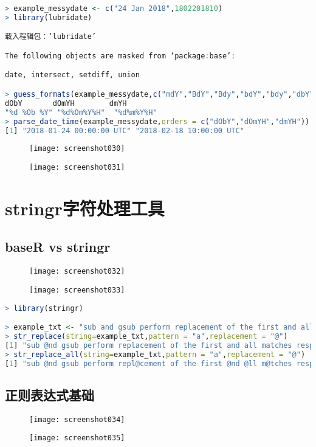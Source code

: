 \documentclass[11pt,a4paper,oneside]{book}
\begin{document}
\begin{lstlisting}[language=r]
> example_messydate <- c("24 Jan 2018",1802201810)
> library(lubridate)

载入程辑包：‘lubridate’

The following objects are masked from ‘package:base’:

date, intersect, setdiff, union

> guess_formats(example_messydate,c("mdY","BdY","Bdy","bdY","bdy","dbY","dmYH"))
dObY       dOmYH        dmYH 
"%d %Ob %Y" "%d%Om%Y%H"  "%d%m%Y%H" 
> parse_date_time(example_messydate,orders = c("dObY","dOmYH","dmYH"))
[1] "2018-01-24 00:00:00 UTC" "2018-02-18 10:00:00 UTC"
\end{lstlisting}
\begin{figure}[H]
	\centering
	\texttt{[image: screenshot030]}
\end{figure}
\begin{figure}[H]
	\centering
	\texttt{[image: screenshot031]}
\end{figure}

\section{stringr字符处理工具}
\subsection{baseR vs stringr}
\begin{figure}[H]
	\centering
	\texttt{[image: screenshot032]}
\end{figure}
\begin{figure}[H]
	\centering
	\texttt{[image: screenshot033]}
\end{figure}

\begin{lstlisting}[language=r]
> library(stringr)

> example_txt <- "sub and gsub perform replacement of the first and all matches respectively."
> str_replace(string=example_txt,pattern = "a",replacement = "@")
[1] "sub @nd gsub perform replacement of the first and all matches respectively."
> str_replace_all(string=example_txt,pattern = "a",replacement = "@")
[1] "sub @nd gsub perform repl@cement of the first @nd @ll m@tches respectively."
\end{lstlisting}

\subsection{正则表达式基础}
\begin{figure}[H]
	\centering
	\texttt{[image: screenshot034]}
\end{figure}
\begin{figure}[H]
	\centering
	\texttt{[image: screenshot035]}
\end{figure}
\end{document}
